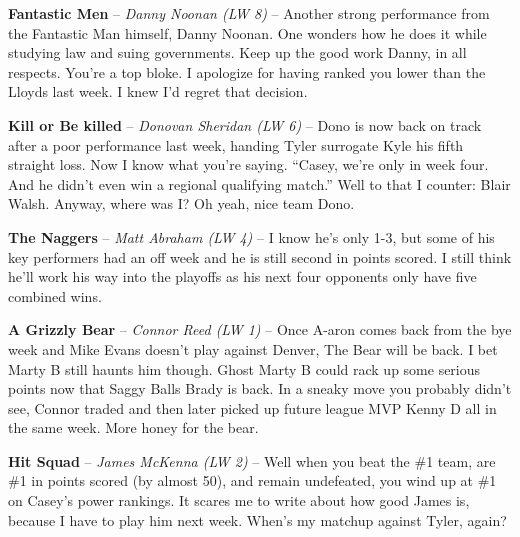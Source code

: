\documentclass[11pt,letterpaper]{article}
\begin{document}
\begin{etaremune}
\item \textbf{Fantastic Men} -- \textit{Danny Noonan (LW 8)} -- Another strong performance from the Fantastic Man himself, Danny Noonan. One wonders how he does it while studying law and suing governments. Keep up the good work Danny, in all respects. You're a top bloke. I apologize for having ranked you lower than the Lloyds last week. I knew I'd regret that decision. 
\item \textbf{Kill or Be killed} -- \textit{Donovan Sheridan (LW 6)} -- Dono is now back on track after a poor performance last week, handing Tyler surrogate Kyle his fifth straight loss. Now I know what you're saying. “Casey, we're only in week four. And he didn't even win a regional qualifying match.” Well to that I counter: Blair Walsh. Anyway, where was I? Oh yeah, nice team Dono. 
\item \textbf{The Naggers} -- \textit{Matt Abraham (LW 4)} -- I know he's only 1-3, but some of his key performers had an off week and he is still second in points scored. I still think he'll work his way into the playoffs as his next four opponents only have five combined wins.
\item \textbf{A Grizzly Bear} -- \textit{Connor Reed (LW 1)} -- Once A-aron comes back from the bye week and Mike Evans doesn't play against Denver, The Bear will be back. I bet Marty B still haunts him though. Ghost Marty B could rack up some serious points now that Saggy Balls Brady is back. In a sneaky move you probably didn’t see, Connor traded and then later picked up future league MVP Kenny D all in the same week. More honey for the bear. 
\item \textbf{Hit Squad} -- \textit{James McKenna (LW 2)} -- Well when you beat the \#1 team, are \#1 in points scored (by almost 50), and remain undefeated, you wind up at \#1 on Casey's power rankings. It scares me to write about how good James is, because I have to play him next week. When's my matchup against Tyler, again?
\end{etaremune}
\end{document}
